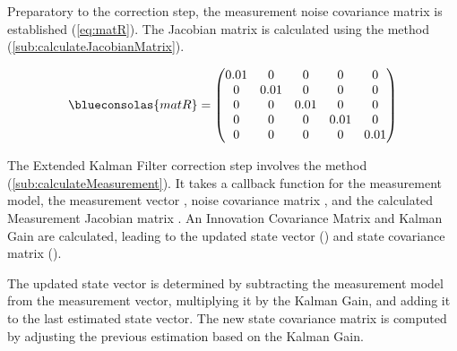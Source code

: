 Preparatory to the correction step, the measurement noise covariance matrix  is established (\ref{eq:matR}). The Jacobian matrix  is calculated using the  method (\ref{sub:calculateJacobianMatrix}).

\begin{equation}
	\begin{centering}
		\blueconsolas{matR} =
		\begin{pmatrix}
			0.01 & 0 & 0 & 0 & 0 \\
			0 & 0.01 & 0 & 0 & 0 \\
			0 & 0 & 0.01 & 0 & 0 \\
			0 & 0 & 0 & 0.01 & 0 \\
			0 & 0 & 0 & 0 & 0.01 \\
		\end{pmatrix}
	\end{centering}
	\label{eq:matR}
\end{equation}

The Extended Kalman Filter correction step involves the  method (\ref{sub:calculateMeasurement}). It takes a callback function for the measurement model, the measurement vector , noise covariance matrix , and the calculated Measurement Jacobian matrix . An Innovation Covariance Matrix and Kalman Gain are calculated, leading to the updated state vector () and state covariance matrix ().

The updated state vector is determined by subtracting the measurement model from the measurement vector, multiplying it by the Kalman Gain, and adding it to the last estimated state vector. The new state covariance matrix is computed by adjusting the previous estimation based on the Kalman Gain.

